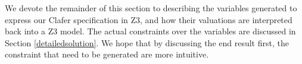 \documentclass{easychair}
\begin{document}
\indent We devote the remainder of this section to describing the variables generated to express our Clafer specification in Z3, and how their valuations are interpreted back into a Z3 model. The actual constraints over the variables are discussed in Section \ref{detailedsolution}. We hope that by discussing the end result first, the constraint that need to be generated are more intuitive.





\end{document}
